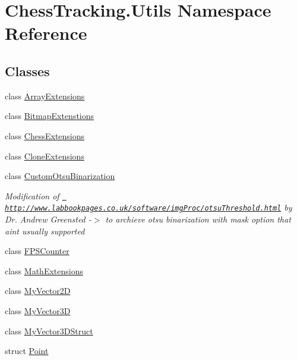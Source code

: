 \hypertarget{namespace_chess_tracking_1_1_utils}{}\section{Chess\+Tracking.\+Utils Namespace Reference}
\label{namespace_chess_tracking_1_1_utils}
\subsection*{Classes}
\begin{DoxyCompactItemize}
\item 
class \mbox{\hyperlink{class_chess_tracking_1_1_utils_1_1_array_extensions}{Array\+Extensions}}
\item 
class \mbox{\hyperlink{class_chess_tracking_1_1_utils_1_1_bitmap_extenstions}{Bitmap\+Extenstions}}
\item 
class \mbox{\hyperlink{class_chess_tracking_1_1_utils_1_1_chess_extensions}{Chess\+Extensions}}
\item 
class \mbox{\hyperlink{class_chess_tracking_1_1_utils_1_1_clone_extensions}{Clone\+Extensions}}
\item 
class \mbox{\hyperlink{class_chess_tracking_1_1_utils_1_1_custom_otsu_binarization}{Custom\+Otsu\+Binarization}}
\begin{DoxyCompactList}\small\item\em Modification of \href{http://www.labbookpages.co.uk/software/imgProc/otsuThreshold.html}{\texttt{ http\+://www.\+labbookpages.\+co.\+uk/software/img\+Proc/otsu\+Threshold.\+html}} by Dr. Andrew Greensted -\/$>$ to archieve otsu binarization with mask option that ain\textquotesingle{}t usually supported \end{DoxyCompactList}\item 
class \mbox{\hyperlink{class_chess_tracking_1_1_utils_1_1_f_p_s_counter}{F\+P\+S\+Counter}}
\item 
class \mbox{\hyperlink{class_chess_tracking_1_1_utils_1_1_math_extensions}{Math\+Extensions}}
\item 
class \mbox{\hyperlink{class_chess_tracking_1_1_utils_1_1_my_vector2_d}{My\+Vector2D}}
\item 
class \mbox{\hyperlink{class_chess_tracking_1_1_utils_1_1_my_vector3_d}{My\+Vector3D}}
\item 
class \mbox{\hyperlink{class_chess_tracking_1_1_utils_1_1_my_vector3_d_struct}{My\+Vector3\+D\+Struct}}
\item 
struct \mbox{\hyperlink{struct_chess_tracking_1_1_utils_1_1_point}{Point}}

\end{DoxyCompactItemize}
